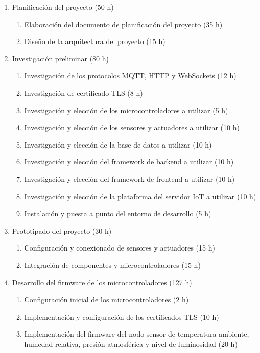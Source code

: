 
\begin{enumerate}
	\item Planificación del proyecto (50 h)
	      \begin{enumerate}
		      \item Elaboración del documento de planificación del proyecto (35 h)
		      \item Diseño de la arquitectura del proyecto (15 h)
	      \end{enumerate}
	\item Investigación preliminar (80 h)
	      \begin{enumerate}
		      \item Investigación de los protocolos MQTT, HTTP y WebSockets (12 h)
		      \item Investigación de certificado TLS (8 h)
		      \item Investigación y elección de los microcontroladores a utilizar (5 h)
		      \item Investigación y elección de los sensores y actuadores a utilizar (10 h)
		      \item Investigación y elección de la base de datos a utilizar (10 h)
		      \item Investigación y elección del framework de backend a utilizar (10 h)
		      \item Investigación y elección del framework de frontend a utilizar (10 h)
		      \item Investigación y elección de la plataforma del servidor IoT a utilizar (10 h)
		      \item Instalación y puesta a punto del entorno de desarrollo (5 h)
	      \end{enumerate}
	\item Prototipado del proyecto (30 h)
	      \begin{enumerate}
		      \item Configuración y conexionado de sensores y actuadores (15 h)
		      \item Integración de componentes y microcontroladores (15 h)
	      \end{enumerate}
	\item Desarrollo del firmware de los microcontroladores (127 h)
	      \begin{enumerate}
		      \item Configuración inicial de los microcontroladores  (2 h)
		      \item Implementación y configuración de los certificados TLS (10 h)
		      \item Implementación del firmware del nodo sensor de temperatura ambiente, humedad relativa, presión atmosférica y nivel de luminosidad (20 h)

\end{enumerate}
\end{enumerate}
